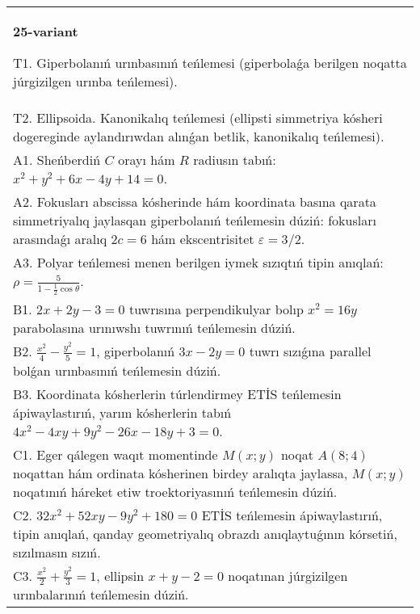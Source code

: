 \documentclass{article}
\begin{document}
\begin{tabular}{m{17cm}}
\textbf{25-variant}
\newline

T1. Giperbolanıń urınbasınıń teńlemesi (giperbolaǵa berilgen noqatta júrgizilgen urınba teńlemesi).\\

T2. Ellipsoida. Kanonikalıq teńlemesi (ellipsti simmetriya kósheri dogereginde aylandırıwdan alınǵan betlik, kanonikalıq teńlemesi).\\

A1. Sheńberdiń $C$ orayı hám $R$ radiusın tabıń: $x^2+y^2+6 x-4 y+14=0$.\\

A2. Fokusları abscissa kósherinde hám koordinata basına qarata simmetriyalıq jaylasqan giperbolanıń teńlemesin dúziń: fokusları arasındaǵı aralıq $2 c=6$ hám ekscentrisitet $\varepsilon=3/2$.\\

A3. Polyar teńlemesi menen berilgen iymek sızıqtıń tipin anıqlań: $\rho=\frac{5}{1-\frac{1}{2}\cos\theta}$.\\

B1. $2x + 2y - 3 = 0$ tuwrısına perpendikulyar bolıp $x^{2} = 16y$ parabolasına urınıwshı tuwrınıń teńlemesin dúziń.  \\

B2. $\frac{x^{2}}{4} - \frac{y^{2}}{5} = 1$, giperbolanıń $3x - 2y = 0$ tuwrı sızıǵına parallel bolǵan urınbasınıń teńlemesin dúziń.  \\

B3. Koordinata kósherlerin túrlendirmey ETİS teńlemesin ápiwaylastırıń, yarım kósherlerin tabıń $4x^{2} - 4xy + 9y^{2} - 26x - 18y + 3 = 0$.\\

C1. Eger qálegen waqıt momentinde $M(x;y)$ noqat $A(8;4)$ noqattan hám ordinata kósherinen birdey aralıqta jaylassa, $M(x;y)$ noqatınıń háreket etiw troektoriyasınıń teńlemesin dúziń.  \\

C2. $32x^{2} + 52xy - 9y^{2} + 180 = 0$ ETİS teńlemesin ápiwaylastırıń, tipin anıqlań, qanday geometriyalıq obrazdı anıqlaytuǵının kórsetiń, sızılmasın sızıń.  \\

C3. $\frac{x^{2}}{2} + \frac{y^{2}}{3} = 1$, ellipsin $x + y - 2 = 0$ noqatınan júrgizilgen urınbalarınıń teńlemesin dúziń.  \\

\end{tabular}
\vspace{1cm}
\end{document}
